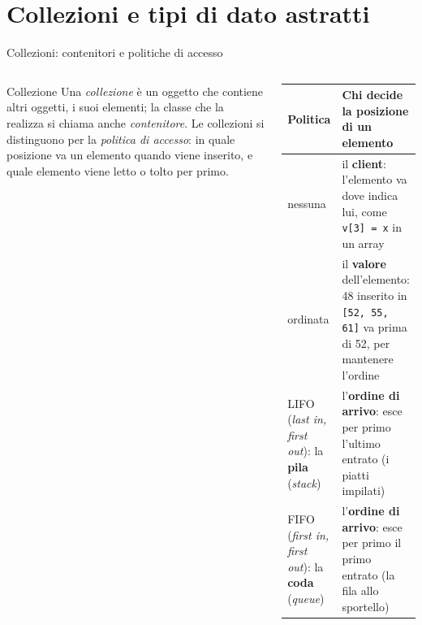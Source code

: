 \documentclass[10pt,aspectratio=169,xcolor={table}]{beamer}
\begin{document}
\section{Collezioni e tipi di dato astratti}

\begin{frame}[fragile]{Collezioni: contenitori e politiche di accesso}
\begin{columns}[T]
\begin{block}{Collezione}
\small Una \emph{collezione} è un oggetto che contiene altri oggetti, i suoi elementi; la classe che la realizza si chiama anche \emph{contenitore}. Le collezioni si distinguono per la \emph{politica di accesso}: in quale posizione va un elemento quando viene inserito, e quale elemento viene letto o tolto per primo.
\end{block}
\scriptsize
\begin{center}
\renewcommand{\arraystretch}{1.15}
\begin{tabular}{|>{\raggedright\arraybackslash}p{2.5cm}|>{\raggedright\arraybackslash}p{4.5cm}|}
\hline
\textbf{Politica} & \textbf{Chi decide la posizione di un elemento} \\
\hline
nessuna & il \textbf{client}: l'elemento va dove indica lui, come \texttt{v[3] = x} in un array \\
\hline
ordinata & il \textbf{valore} dell'elemento: 48 inserito in \texttt{[52, 55, 61]} va prima di 52, per mantenere l'ordine \\
\hline
LIFO (\emph{last in, first out}): la \textbf{pila} (\emph{stack}) & l'\textbf{ordine di arrivo}: esce per primo l'ultimo entrato (i piatti impilati) \\
\hline
FIFO (\emph{first in, first out}): la \textbf{coda} (\emph{queue}) & l'\textbf{ordine di arrivo}: esce per primo il primo entrato (la fila allo sportello) \\
\hline
\end{tabular}
\end{center}


\end{columns}
\end{frame}
\end{document}

